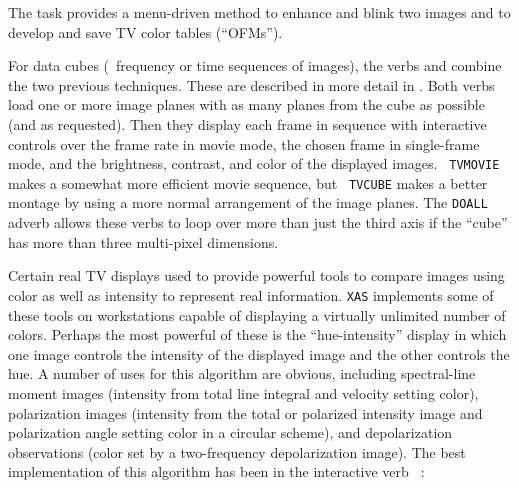      The task {\tt {}} provides a menu-driven method to
enhance and blink two images and to develop and save TV color tables
(``OFMs'').

     For data cubes (\eg\ frequency or time sequences of images), the
verbs {\tt {}} and {\tt {}} combine the two
previous techniques.  These are described in more detail in
.  Both verbs load one or more image planes with as many
planes from the cube as possible (and as requested).  Then they
display each frame in sequence with interactive controls over the
frame rate in movie mode, the chosen frame in single-frame mode, and
the brightness, contrast, and color of the displayed images.  {\tt
TVMOVIE} makes a somewhat more efficient movie sequence, but {\tt
TVCUBE} makes a better montage by using a more normal arrangement of
the image planes.  The {\tt DOALL} adverb allows these verbs to loop
over more than just the third axis if the ``cube'' has more than three
multi-pixel dimensions.

     Certain real TV displays used to provide powerful tools to
compare images using color as well as intensity to represent real
information.  {\tt XAS} implements some of these tools on workstations
capable of displaying a virtually unlimited number of colors.  Perhaps
the most powerful of these is the ``hue-intensity'' display in which
one image controls the intensity of the displayed image and the other
controls the hue.    A number of uses for this algorithm are obvious,
including spectral-line moment images (intensity from total line
integral and velocity setting color), polarization images (intensity
from the total or polarized intensity image and polarization angle
setting color in a circular scheme), and depolarization observations
(color set by a two-frequency depolarization image).   The best
implementation of this algorithm has been in the interactive verb {\tt
{}}:

